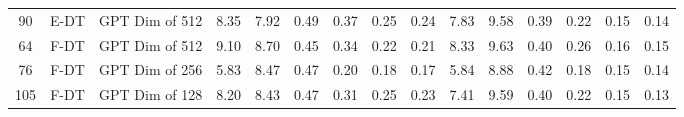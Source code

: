 \begin{table}
\begin{tabular}{@{\hskip3pt}c@{\hskip3pt}c@{\hskip3pt}c@{\hskip3pt}c@{\hskip3pt}c@{\hskip3pt}c@{\hskip3pt}c@{\hskip3pt}c@{\hskip3pt}c@{\hskip3pt}c@{\hskip3pt}c@{\hskip3pt}c@{\hskip3pt}c@{\hskip3pt}c@{\hskip3pt}c}
         90 &           E-DT &            GPT Dim of 512 &              8.35 &        7.92 &          0.49 &        0.37 &        0.25 &         0.24 &                7.83 &        9.58 &          0.39 &        0.22 &        0.15 &         0.14 \\
         64 &           F-DT &            GPT Dim of 512 &              9.10 &        8.70 &          0.45 &        0.34 &        0.22 &         0.21 &                8.33 &        9.63 &          0.40 &        0.26 &        0.16 &         0.15 \\
         76 &           F-DT &            GPT Dim of 256 &              5.83 &        8.47 &          0.47 &        0.20 &        0.18 &         0.17 &                5.84 &        8.88 &          0.42 &        0.18 &        0.15 &         0.14 \\
        105 &           F-DT &            GPT Dim of 128 &              8.20 &        8.43 &          0.47 &        0.31 &        0.25 &         0.23 &                7.41 &        9.59 &          0.40 &        0.22 &        0.15 &         0.13 \\
\bottomrule
\end{tabular}
\end{table}
